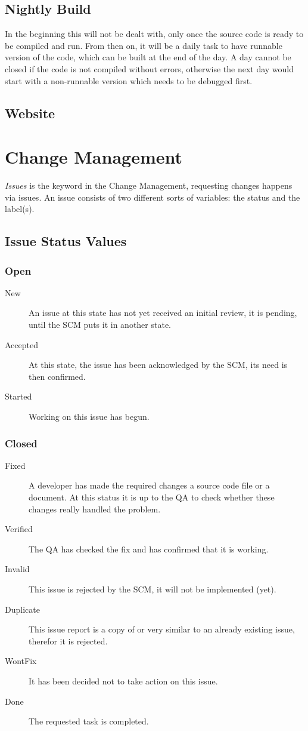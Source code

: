 \documentclass{report}
\begin{document}
\section{Nightly Build}
In the beginning this will not be dealt with, only once the source code is ready to be compiled and run.
From then on, it will be a daily task to have runnable version of the code, which can be built at the end of the day.
A day cannot be closed if the code is not compiled without errors, otherwise the next day would start with a non-runnable version which needs to be debugged first.

\section{Website}

\chapter{Change Management}
{\it Issues} is the keyword in the Change Management, requesting changes happens via issues.
An issue consists of two different sorts of variables: the status and the label(s).

\section{Issue Status Values}
\subsection{Open}
\begin{description}
\item[New]
An issue at this state has not yet received an initial review, it is pending, until the SCM puts it in another state.
\item[Accepted]
At this state, the issue has been acknowledged by the SCM, its need is then confirmed.
\item[Started]
Working on this issue has begun.
\end{description}
\subsection{Closed}
\begin{description}
\item[Fixed]
A developer has made the required changes a source code file or a document.
At this status it is up to the QA to check whether these changes really handled the problem.
\item[Verified]
The QA has checked the fix and has confirmed that it is working.
\item[Invalid]
This issue is rejected by the SCM, it will not be implemented (yet).
\item[Duplicate]
This issue report is a copy of or very similar to an already existing issue, therefor it is rejected.
\item[WontFix]
It has been decided not to take action on this issue.
\item[Done]
The requested task is completed.
\end{description}
\end{document}
